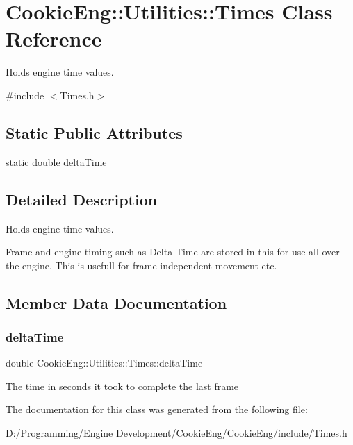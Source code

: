 \hypertarget{struct_cookie_eng_1_1_utilities_1_1_times}{}\section{Cookie\+Eng\+:\+:Utilities\+:\+:Times Class Reference}
\label{struct_cookie_eng_1_1_utilities_1_1_times}


Holds engine time values.  




{\ttfamily \#include $<$Times.\+h$>$}

\subsection*{Static Public Attributes}
\begin{DoxyCompactItemize}
\item 
static double \hyperlink{struct_cookie_eng_1_1_utilities_1_1_times_abab3889716480204f7250ff3347b8392}{delta\+Time}
\end{DoxyCompactItemize}


\subsection{Detailed Description}
Holds engine time values. 

Frame and engine timing such as Delta Time are stored in this for use all over the engine. This is usefull for frame independent movement etc. 

\subsection{Member Data Documentation}
\mbox{\label{struct_cookie_eng_1_1_utilities_1_1_times_abab3889716480204f7250ff3347b8392}} 
\subsubsection{\texorpdfstring{delta\+Time}{deltaTime}}
{\footnotesize\ttfamily double Cookie\+Eng\+::\+Utilities\+::\+Times\+::delta\+Time\hspace{0.3cm}{\ttfamily [static]}}

The time in seconds it took to complete the last frame 

The documentation for this class was generated from the following file\+:\begin{DoxyCompactItemize}
\item 
D\+:/\+Programming/\+Engine Development/\+Cookie\+Eng/\+Cookie\+Eng/include/Times.\+h\end{DoxyCompactItemize}

